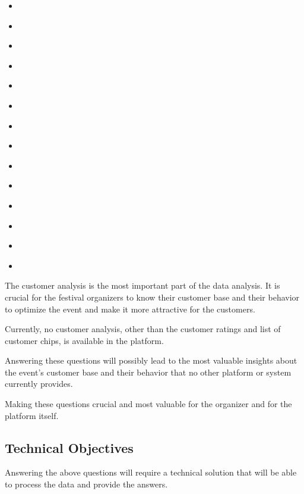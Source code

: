 \begin{itemize}
	\item \textit{}
	\item \textit{}
	\item \textit{}
	\item \textit{}
	\item \textit{}
	\item \textit{}
	\item \textit{}
	\item \textit{}
	\item \textit{}
	\item \textit{}
	\item \textit{}
	\item \textit{}
	\item \textit{}
	\item \textit{}
\end{itemize}

The customer analysis is the most important part of the data analysis.
It is crucial for the festival organizers to know their customer base and their behavior to optimize the event and make it more attractive for the customers.

Currently, no customer analysis, other than the customer ratings and list of customer chips, is available in the platform.

Answering these questions will possibly lead to the most valuable insights about the event's customer base and their behavior that no other platform or system currently provides.

Making these questions crucial and most valuable for the organizer and for the platform itself.

\subsection*{Technical Objectives}
\label{subsec:introduction-objectives-technical}
Answering the above questions will require a technical solution that will be able to process the data and provide the answers.

